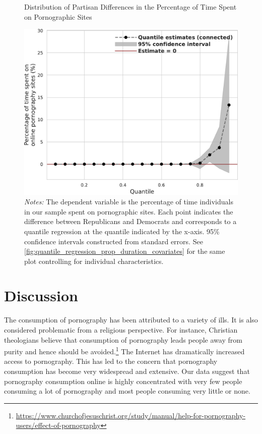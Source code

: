 \documentclass[12pt, letterpaper]{article}
\begin{document}
\begin{figure}[t]
	\centering
	\caption{Distribution of Partisan Differences in the Percentage of Time Spent on Pornographic Sites}

	\includegraphics[width=.7\linewidth]{figs/quantile_reg_proportion_duration_adult.pdf}

	\caption*{\footnotesize \emph{Notes:} 
		The dependent variable is the percentage of time individuals in our sample spent on pornographic sites.
        Each point indicates the difference between Republicans and Democrats and corresponds to a quantile regression at the quantile indicated by the x-axis.
		95\% confidence intervals constructed from standard errors.
		See \cref{fig:quantile_regression_prop_duration_covariates} for the same plot controlling for individual characteristics.
	}
	\label{fig:quantile_regression_prop_duration}

\end{figure}



\section*{Discussion}\label{sec:discussion}
The consumption of pornography has been attributed to a variety of ills. It is also considered problematic from a religious perspective. For instance, Christian theologians believe that consumption of pornography leads people away from purity and hence should be avoided.\footnote{\url{https://www.churchofjesuschrist.org/study/manual/help-for-pornography-users/effect-of-pornography}} The Internet has dramatically increased access to pornography. This has led to the concern that pornography consumption has become very widespread and extensive. Our data suggest that pornography consumption online is highly concentrated with very few people consuming a lot of pornography and most people consuming very little or none.
\end{document}
